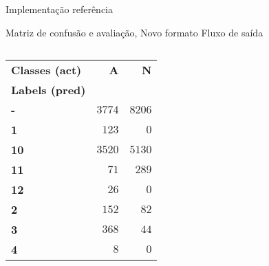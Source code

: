 \documentclass[aspectratio=43,10pt]{beamer}
\begin{document}
\begin{frame}[fragile]{Implementação referência}
  \begin{alertblock}{Matriz de confusão e avaliação, Novo formato Fluxo de saída}
    \hspace{0.5em}
    
    \begin{columns}[T,onlytextwidth]
      \footnotesize{
      \begin{tabular}
        { l                     | r          | r           }%
        \textbf{Classes (act)}  & \textbf{A} & \textbf{N}  \\ %
        \textbf{Labels (pred)}  &            &             \\ %
        \hline
        \hline \textbf{-}       &   $3774$   &   $8206$   \\ %
        \hline \textbf{1}       &    $123$   &      $0$   \\ %
        \hline \textbf{10}      &   $3520$   &   $5130$   \\ %
        \hline \textbf{11}      &     $71$   &    $289$   \\ %
        \hline \textbf{12}      &     $26$   &      $0$   \\ %
        \hline \textbf{2}       &    $152$   &     $82$   \\ %
        \hline \textbf{3}       &    $368$   &     $44$   \\ %
        \hline \textbf{4}       &      $8$   &      $0$   \\ %

\end{tabular}}
\end{columns}
\end{alertblock}
\end{frame}
\end{document}
